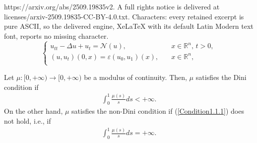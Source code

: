 \documentclass[10pt,a4paper]{amsart}
\newcommand{\R}{\mathbb{R}}
\begin{document}
https://arxiv.org/abs/2509.19835v2. A full rights notice is delivered at licenses/arxiv-2509.19835-CC-BY-4.0.txt. Characters: every retained excerpt is pure ASCII, so the delivered engine, XeLaTeX with its default Latin Modern text font, reports no missing character.
\begin{equation} \label{Main.Eq.1}
\begin{cases}
u_{tt} -\Delta u + u_t= \mathcal{N}(u), &\quad x\in \R^n,\, t > 0, \\
(u, u_t)(0,x) = \varepsilon (u_0, u_1)(x), &\quad x\in \R^n, \\
\end{cases}
\end{equation}

\begin{definition}
    Let $\mu : [0, +\infty) \to [0, +\infty)$ be a modulus of continuity. Then, $\mu$ satisfies the Dini condition if
    \begin{align}
        \int_0^{1} \frac{\mu(s)}{s} ds < +\infty. \label{Condition1.1.1}
    \end{align}
    On the other hand, $\mu$ satisfies the non-Dini condition if (\ref{Condition1.1.1}) does not hold, i.e., if
    \begin{align}
        \int_0^{1} \frac{\mu(s)}{s} ds = +\infty. \label{Condition1.2.1}
    \end{align}
\end{definition}
\end{document}
